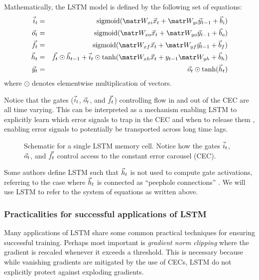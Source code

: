 Mathematically, the LSTM model is defined by the following set of equations:
\begin{align}
    \i_t &=& \sigmoid(\W_{xi} \x_t + \W_{yi} \y_{t-1} + \b_i) \\
    \o_t &=& \sigmoid(\W_{xo} \x_t + \W_{yo} \y_{t-1} + \b_o) \\
    \f_t &=& \sigmoid(\W_{xf} \x_t + \W_{yf} \y_{t-1} + \b_f) \\
    \h_t &=& \f_t \odot \h_{t-1} + \i_t \odot \tanh(\W_{xh}\x_t + y_{t-1} \W_{yh} + \b_h) \label{eq:lstm-dynamics} \\
    \y_t &=& \o_t \odot \tanh(\h_t)
\end{align}
where $\odot$ denotes elementwise multiplication of vectors.

Notice that the gates ($\vec{i}_t$, $\vec{o}_t$, and $\vec{f}_t$) controlling flow in and out
of the CEC are all time varying. This can be interpreted as a mechanism
enabling LSTM to explicitly learn which error signals to trap in the CEC and
when to release them \citep{hochreiter1997long}, enabling error signals to
potentially be transported across long time lags.

\begin{figure}[htpb]
    \centering
    
    \caption{Schematic for a single LSTM memory cell. Notice how the gates $\vec{i}_t$, $\vec{o}_t$, and $\vec{f}_t$ control access to the constant error carousel (CEC).}
    \label{fig:lstm-cell}
\end{figure}

Some authors define LSTM such that $\vec{h}_t$ is not used to compute gate
activations, referring to the case where $\vec{h}_t$ is connected as ``peephole
connections'' \citep{gers2000recurrent}. We will use LSTM to refer to the
system of equations as written above.

\subsubsection{Practicalities for successful applications of LSTM}

Many applications of LSTM  share some common practical
techniques for ensuring successful training. Perhaps most important is
\emph{gradient norm clipping} \citep{Mikolov2012,Pascanu2012} where the
gradient is rescaled whenever it exceeds a threshold. This is necessary because
while vanishing gradients are mitigated by the use of CECs, LSTM do not
explicitly protect against exploding gradients.


